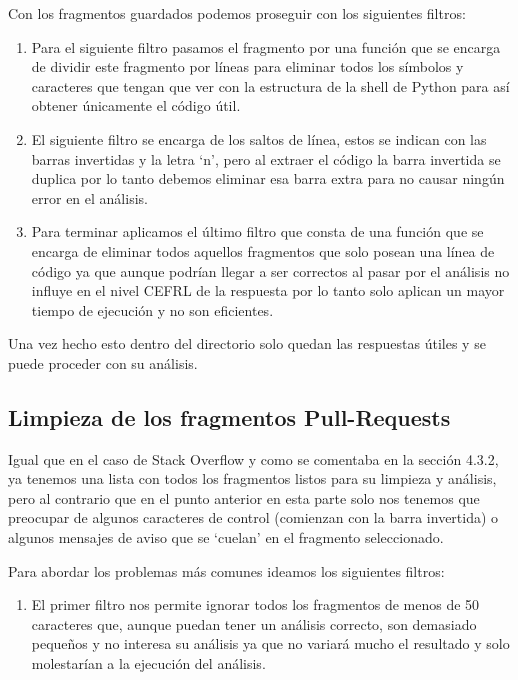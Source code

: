 \documentclass[a4paper, 12pt]{book}
\begin{document}
Con los fragmentos guardados podemos proseguir con los siguientes filtros:

\begin{enumerate}
	\item Para el siguiente filtro pasamos el fragmento por una función que se encarga de dividir este fragmento por líneas para eliminar todos los símbolos y caracteres que tengan que ver con la estructura de la shell de Python para así obtener únicamente el código útil.
	\item El siguiente filtro se encarga de los saltos de línea, estos se indican con las barras invertidas y la letra `n', pero al extraer el código la barra invertida se duplica por lo tanto debemos eliminar esa barra extra para no causar ningún error en el análisis.
	\item Para terminar aplicamos el último filtro que consta de una función que se encarga de eliminar todos aquellos fragmentos que solo posean una línea de código ya que aunque podrían llegar a ser correctos al pasar por el análisis no influye en el nivel CEFRL de la respuesta por lo tanto solo aplican un mayor tiempo de ejecución y no son eficientes.
\end{enumerate}

Una vez hecho esto dentro del directorio solo quedan las respuestas útiles y se puede proceder con su análisis.

\subsection{Limpieza de los fragmentos Pull-Requests}

Igual que en el caso de Stack Overflow y como se comentaba en la sección 4.3.2, ya tenemos una lista con todos los fragmentos listos para su limpieza y análisis, pero al contrario que en el punto anterior en esta parte solo nos tenemos que preocupar de algunos caracteres de control (comienzan con la barra invertida) o algunos mensajes de aviso que se `cuelan' en el fragmento seleccionado.

Para abordar los problemas más comunes ideamos los siguientes filtros:

\begin{enumerate}
	\item El primer filtro nos permite ignorar todos los fragmentos de menos de 50 caracteres que, aunque puedan tener un análisis correcto, son demasiado pequeños y no interesa su análisis ya que no variará mucho el resultado y solo molestarían a la ejecución del análisis.
\end{enumerate}
\end{document}
